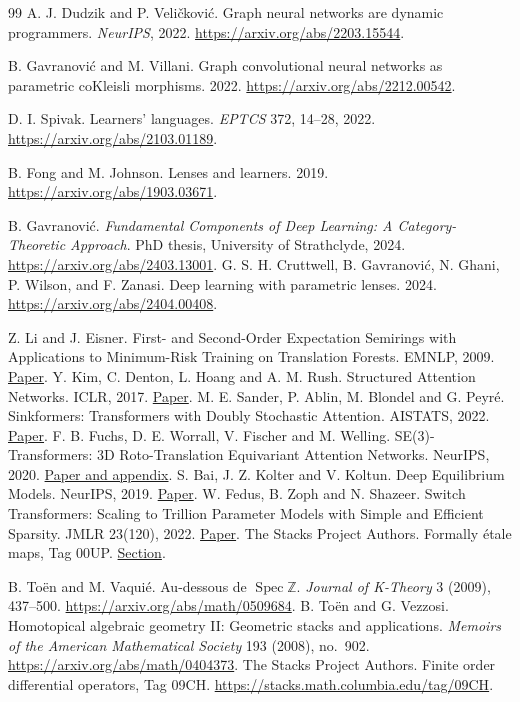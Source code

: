 \documentclass[11pt,a4paper]{article}
\theoremstyle{definition}
\theoremstyle{remark}\newaliascnt{remark}{theorem}
\numberwithin{equation}{section}
\begin{document}
\begin{thebibliography}{99}
A. J. Dudzik and P. Veli\v{c}kovi\'c. Graph neural networks are dynamic programmers.
\emph{NeurIPS}, 2022. \url{https://arxiv.org/abs/2203.15544}.

B. Gavranovi\'c and M. Villani. Graph convolutional neural networks as parametric coKleisli morphisms. 2022. \url{https://arxiv.org/abs/2212.00542}.

D. I. Spivak. Learners' languages. \emph{EPTCS} 372, 14--28, 2022.
\url{https://arxiv.org/abs/2103.01189}.

B. Fong and M. Johnson. Lenses and learners. 2019.
\url{https://arxiv.org/abs/1903.03671}.

B. Gavranovi\'c. \emph{Fundamental Components of Deep Learning: A Category-Theoretic Approach}.
PhD thesis, University of Strathclyde, 2024. \url{https://arxiv.org/abs/2403.13001}.
G. S. H. Cruttwell, B. Gavranovi\'c, N. Ghani, P. Wilson, and F. Zanasi.
Deep learning with parametric lenses. 2024. \url{https://arxiv.org/abs/2404.00408}.

 Z. Li and J. Eisner. First- and Second-Order Expectation Semirings with Applications to Minimum-Risk Training on Translation Forests. EMNLP, 2009. \href{https://aclanthology.org/D09-1005/}{Paper}.
 Y. Kim, C. Denton, L. Hoang and A. M. Rush. Structured Attention Networks. ICLR, 2017. \href{https://arxiv.org/abs/1702.00887}{Paper}.
 M. E. Sander, P. Ablin, M. Blondel and G. Peyr\'e. Sinkformers: Transformers with Doubly Stochastic Attention. AISTATS, 2022. \href{https://proceedings.mlr.press/v151/sander22a.html}{Paper}.
 F. B. Fuchs, D. E. Worrall, V. Fischer and M. Welling. SE(3)-Transformers: 3D Roto-Translation Equivariant Attention Networks. NeurIPS, 2020. \href{https://arxiv.org/abs/2006.10503}{Paper and appendix}.
 S. Bai, J. Z. Kolter and V. Koltun. Deep Equilibrium Models. NeurIPS, 2019. \href{https://arxiv.org/abs/1909.01377}{Paper}.
 W. Fedus, B. Zoph and N. Shazeer. Switch Transformers: Scaling to Trillion Parameter Models with Simple and Efficient Sparsity. JMLR 23(120), 2022. \href{https://jmlr.org/papers/v23/21-0998.html}{Paper}.
 The Stacks Project Authors. Formally \'etale maps, Tag 00UP. \href{https://stacks.math.columbia.edu/tag/00UP}{Section}.

 B. To\"en and M. Vaqui\'e. Au-dessous de $\operatorname{Spec}\mathbb Z$. \emph{Journal of K-Theory} 3 (2009), 437--500. \url{https://arxiv.org/abs/math/0509684}.
 B. To\"en and G. Vezzosi. Homotopical algebraic geometry II: Geometric stacks and applications. \emph{Memoirs of the American Mathematical Society} 193 (2008), no.~902. \url{https://arxiv.org/abs/math/0404373}.
 The Stacks Project Authors. Finite order differential operators, Tag 09CH. \url{https://stacks.math.columbia.edu/tag/09CH}.


\end{thebibliography}
\end{document}
